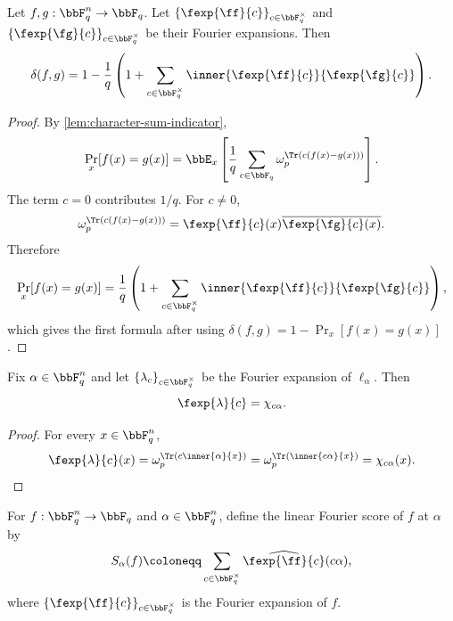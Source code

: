 \begin{lemma}
\label{lem:distance-formula}
\leanok
Let $f,g:\bbF_q^n\to\bbF_q$.
Let $\{\fexp{\ff}{c}\}_{c\in\bbF_q^\times}$ and
$\{\fexp{\fg}{c}\}_{c\in\bbF_q^\times}$ be their Fourier expansions.
Then
\[
    \delta(f,g)
    = 1-\frac{1}{q}\left(1+
        \sum_{c\in\bbF_q^\times}
        \inner{\fexp{\ff}{c}}{\fexp{\fg}{c}}
    \right).
\]
\end{lemma}

\begin{proof}\leanok
By \cref{lem:character-sum-indicator},
\[
    \Pr_x[f(x)=g(x)]
    = \bbE_x\left[\frac{1}{q}\sum_{c\in\bbF_q}
        \omega_p^{\Tr(c(f(x)-g(x)))}\right].
\]
The term $c=0$ contributes $1/q$. For $c\ne 0$,
\[
    \omega_p^{\Tr(c(f(x)-g(x)))}
    = \fexp{\ff}{c}(x)\overline{\fexp{\fg}{c}(x)}.
\]
Therefore
\[
    \Pr_x[f(x)=g(x)]
    =\frac{1}{q}\left(1+\sum_{c\in\bbF_q^\times}
        \inner{\fexp{\ff}{c}}{\fexp{\fg}{c}}
    \right),
\]
which gives the first formula after using
$\delta(f,g)=1-\Pr_x[f(x)=g(x)]$.
\end{proof}

\begin{lemma}
\label{lem:linear-function-fourier-expansion}
\leanok
Fix $\alpha\in\bbF_q^n$ and let $\{\lambda_c\}_{c \in \bbF_q^\times}$ be the Fourier expansion of $\ell_\alpha$.
Then
\[
    \fexp{\lambda}{c}=\chi_{c\alpha}.
\]
\end{lemma}

\begin{proof}\leanok
For every $x\in\bbF_q^n$,
\[
    \fexp{\lambda}{c}(x)
    = \omega_p^{\Tr(c\inner{\alpha}{x})}
    = \omega_p^{\Tr(\inner{c\alpha}{x})}
    = \chi_{c\alpha}(x).
\]
\end{proof}

\begin{definition}
\label{def:linear-fourier-score}
\leanok
For $f:\bbF_q^n\to\bbF_q$ and $\alpha\in\bbF_q^n$, define the linear Fourier score
of $f$ at $\alpha$ by
\[
    S_\alpha(f) \coloneqq \sum_{c\in\bbF_q^\times}
        \widehat{\fexp{\ff}{c}}(c\alpha),
\]
where $\{\fexp{\ff}{c}\}_{c \in \bbF_q^\times}$ is the Fourier expansion of $f$.
\end{definition}

